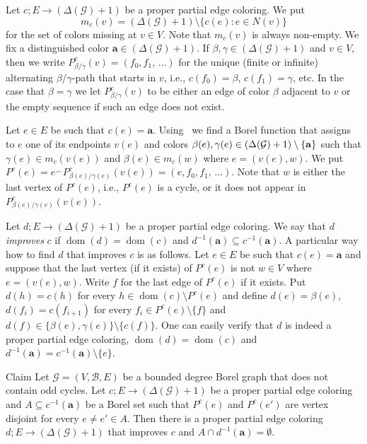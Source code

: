 \documentclass[AHL,Unicode,longabstracts,published]{cedram}
\DeclareMathOperator{\dom}{dom}
\newcommand{\bfa}{\mathbf{a}}
\newcommand{\clG}{\mathcal{G}}
\newcommand{\clB}{\mathcal{B}}
\newcommand{\clG}{\mathcal{G}}
\begin{document}
Let $c;E\to (\Delta(\clG)+1)$ be a proper partial edge coloring. We put
\[
m_c(v)=(\Delta(\clG)+1)\setminus \{c(e):e\in N(v)\}
\]
for the set of colors missing at $v\in V$. Note that $m_c(v)$ is always non-empty. We fix a distinguished color $\bfa\in (\Delta(\clG)+1)$. If $\beta,\gamma\in (\Delta(\clG)+1)$ and $v\in V$, then we write $P^c_{\beta/\gamma}(v)=(f_0,f_1,\,\dots)$ for the unique (finite or infinite) alternating $\beta/\gamma$-path that starts in $v$, i.e., $c(f_0)=\beta$, $c(f_1)=\gamma$, etc. In the case that $\beta=\gamma$ we let $P^c_{\beta/\gamma}(v)$ to be either an edge of color $\beta$ adjacent to $v$ or the empty sequence if such an edge does not exist.

Let $e\in E$ be such that $c(e)=\bfa$. Using~\cite[Theorem~18.10]{Kec} we find a Borel function that assigns to $e$ one of its endpoints $v(e)$ and colors $\beta(e),\gamma(e)\in (\Delta(\clG)+1)\linebreak\setminus \{\bfa\}$ such that $\gamma(e)\in m_c(v(e))$ and $\beta(e)\in m_c(w)$ where $e=(v(e),w)$. We put $P^c(e)=e^\frown P^c_{\beta(e)/\gamma(e)}(v(e))=(e,f_0,f_1,\,\dots)$. Note that $w$ is either the last vertex of $P^c(e)$, i.e., $P^c(e)$ is a cycle, or it does not appear in $P^c_{\beta(e)/\gamma(e)}(v(e))$.

Let $d;E\to (\Delta(\clG)+1)$ be a proper partial edge coloring. We say that $d$ \emph{improves} $c$ if $\dom(d)=\dom(c)$ and $d^{-1}(\bfa)\subseteq c^{-1}(\bfa)$. A particular way how to find $d$ that improves $c$ is as follows. Let $e\in E$ be such that $c(e)=\bfa$ and suppose that the last vertex (if it exists) of $P^c(e)$ is not $w\in V$ where $e=(v(e),w)$. Write $f$ for the last edge of $P^c(e)$ if it exists. Put $d(h)=c(h)$ for every $h\in \dom(c)\setminus P^c(e)$ and define $d(e)=\beta(e)$, $d(f_i)=c(f_{i+1})$ for every $f_i\in P^c(e)\setminus \{f\}$ and $d(f)\in\{\beta(e),\gamma(e)\}\setminus \{c(f)\}$. One can easily verify that $d$ is indeed a proper partial edge coloring, $\dom(d)=\dom(c)$ and $d^{-1}(\bfa)= c^{-1}(\bfa)\setminus \{e\}$.

\begin{enonce}{Claim}\label{cl:augment}
Let $\clG=(V,\clB,E)$ be a bounded degree Borel graph that does not contain odd cycles. Let $c;E\to (\Delta(\clG)+1)$ be a proper partial edge coloring and $A\subseteq c^{-1}(\bfa)$ be a Borel set such that $P^c(e)$ and $P^c(e')$ are vertex disjoint for every $e\not =e'\in A$. Then there is a proper partial edge coloring $d;E\to (\Delta(\clG)+1)$ that improves $c$ and $A\cap d^{-1}(\bfa)=\emptyset$.
\end{enonce}
\end{document}
